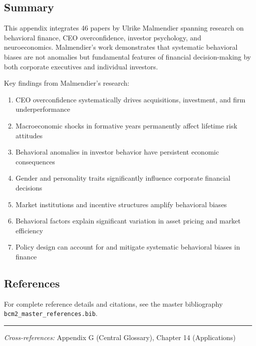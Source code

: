 \subsection{Summary}

This appendix integrates 46 papers by Ulrike Malmendier spanning research on behavioral finance, CEO overconfidence, investor psychology, and neuroeconomics. Malmendier's work demonstrates that systematic behavioral biases are not anomalies but fundamental features of financial decision-making by both corporate executives and individual investors.

Key findings from Malmendier's research:

\begin{enumerate}
  \item CEO overconfidence systematically drives acquisitions, investment, and firm underperformance
  \item Macroeconomic shocks in formative years permanently affect lifetime risk attitudes
  \item Behavioral anomalies in investor behavior have persistent economic consequences
  \item Gender and personality traits significantly influence corporate financial decisions
  \item Market institutions and incentive structures amplify behavioral biases
  \item Behavioral factors explain significant variation in asset pricing and market efficiency
  \item Policy design can account for and mitigate systematic behavioral biases in finance
\end{enumerate}

\subsection{References}

For complete reference details and citations, see the master bibliography
\texttt{bcm2\_master\_references.bib}.

\vspace{1em}
\hrule
\vspace{0.5em}

\noindent\textit{Cross-references:}
Appendix G (Central Glossary), Chapter 14 (Applications)
